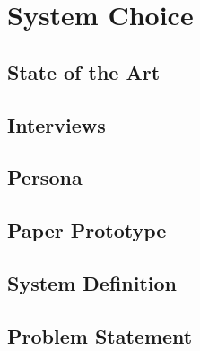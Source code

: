 \chapter{System Choice}


\section{State of the Art}
\label{StateOfTheArt}


\section{Interviews}





\section{Persona}


\section{Paper Prototype}

\section{System Definition}


\section{Problem Statement}
\label{ProblemStatement}

